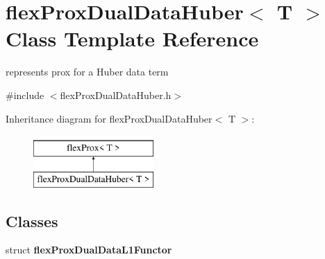 \hypertarget{classflex_prox_dual_data_huber}{}\section{flex\+Prox\+Dual\+Data\+Huber$<$ T $>$ Class Template Reference}
\label{classflex_prox_dual_data_huber}


represents prox for a Huber data term  




{\ttfamily \#include $<$flex\+Prox\+Dual\+Data\+Huber.\+h$>$}

Inheritance diagram for flex\+Prox\+Dual\+Data\+Huber$<$ T $>$\+:\begin{figure}[H]
\begin{center}
\leavevmode
\includegraphics[height=2.000000cm]{classflex_prox_dual_data_huber}
\end{center}
\end{figure}
\subsection*{Classes}
\begin{DoxyCompactItemize}
\item 
struct {\bfseries flex\+Prox\+Dual\+Data\+L1\+Functor}
\end{DoxyCompactItemize}
